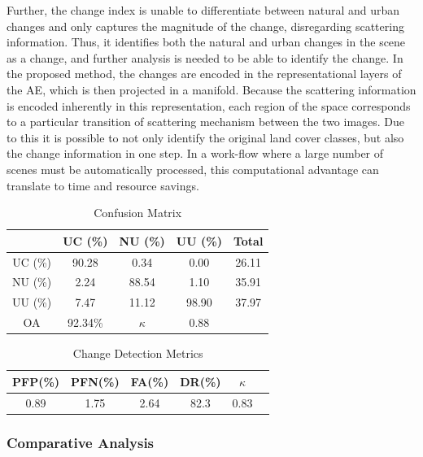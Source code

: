 Further, the change index is unable to differentiate between natural and urban changes and only captures the magnitude of the change, disregarding scattering information. Thus, it identifies both the natural and urban changes in the scene as a change, and further analysis is needed to be able to identify the change. In the proposed method, the changes are encoded in the representational layers of the AE, which is then projected in a manifold. Because the scattering information is encoded inherently in this representation, each region of the space corresponds to a particular transition of scattering mechanism between the two images. Due to this it is possible to not only identify the original land cover classes, but also the change information in one step. In a work-flow where a large number of scenes must be automatically processed, this computational advantage can translate to time and resource savings.

\begin{table}
	\centering
	\caption{Confusion Matrix}
	\label{tab:conf}
	\begin{tabular}{cccc|c}
		&  UC (\%)  & NU (\%) & UU (\%) & Total \\ \hline
		UC (\%) & 90.28 & 0.34 &  0.00 & 26.11 \\
		NU (\%) & 2.24 & 88.54 & 1.10  & 35.91\\
		UU (\%) & 7.47 & 11.12 & 98.90 & 37.97\\ \hline
		OA   & 92.34\% &  $\kappa$   & 0.88 & \\ 
	\end{tabular}
	
\end{table}
\begin{table}
	\centering
	\caption{Change Detection Metrics}
	\label{tab:cd}
	\begin{tabular}{c c c c c c}
		PFP(\%)  & PFN(\%) & FA(\%) & DR(\%) & $\kappa$ \\ \hline
		0.89 & 1.75 & 2.64 & 82.3 & 0.83 \\
	\end{tabular}
\end{table}



\subsubsection{Comparative Analysis}

